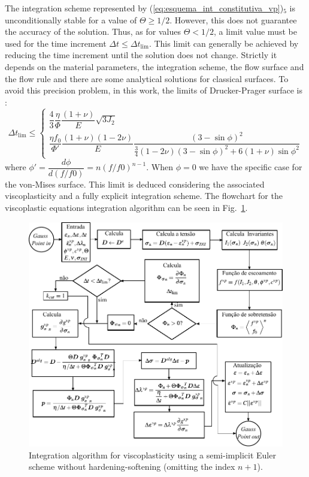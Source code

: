 \documentclass[Journal,letterpaper]{ascelike-new}
\begin{document}
The integration scheme represented by (\ref{eq:esquema_int_constitutiva_vp})$_5$ is unconditionally stable for a value of $\Theta \geq 1/2$. However, this does not guarantee the accuracy of the solution. Thus, as for values $\Theta < 1/2$, a limit value must be used for the time increment $\Delta t \leq \Delta t_{\text{lim}}$. This limit can generally be achieved by reducing the time increment until the solution does not change. Strictly it depends on the material parameters, the integration scheme, the flow surface and the flow rule and there are some analytical solutions for classical surfaces. To avoid this precision problem, in this work, the limits of Drucker-Prager surface is \cite{cormeau1975}:
\begin{equation}
	\label{eq:deltatmin_dp}
	\Delta t_{\text{lim}} \leq \left\{ 
	\begin{array}{lcl} 
		\dfrac{4}{3}\dfrac{\eta}{\Phi}\dfrac{(1+\nu)}{E} {\sqrt{3J_2}} \\
		\dfrac{\eta f_0}{\Phi'}\dfrac{(1+\nu)(1-2\nu)}{E}\dfrac{(3-\sin{\phi})^2}{\frac{3}{4}(1-2\nu)(3-\sin{\phi})^2 + 6(1+\nu)\sin{\phi}^2}
	\end{array} \right.
\end{equation}
where $\phi'= \dfrac{d \phi}{d(f/f0)} = n(f/f0)^{n-1}$. When $\phi = 0$ we have the specific case for the von-Mises surface. This limit is deduced considering the associated viscoplasticity and a fully explicit integration scheme. The flowchart for the viscoplastic equations integration algorithm can be seen in Fig.~\ref{integração VP semi-implicito}.
\begin{figure}
	\centering
		\includegraphics[scale = 1.0]{integração VP semi-implicito.pdf}
	\caption{\label{integração VP semi-implicito}Integration algorithm for viscoplasticity using a semi-implicit Euler scheme without hardening-softening (omitting the index $n+1$).}
\end{figure}
\end{document}
